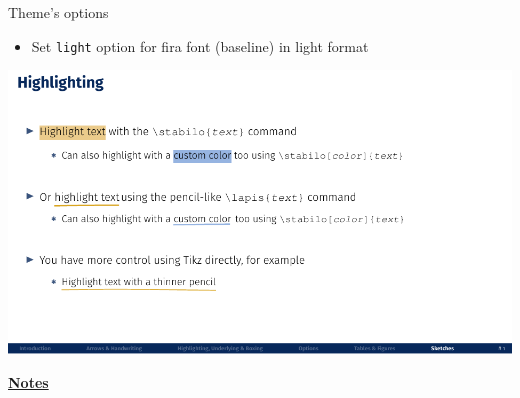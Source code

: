 \documentclass[10pt]{beamer}
\begin{document}
\begin{frame}
    {Theme's options}
    \begin{itemize}
        \item Set \texttt{light} option for fira font (baseline) in light format 
    \end{itemize}
    \begin{center}
        \begin{minipage}[b]{.6\textwidth}
            \includegraphics[width=\textwidth]{light}
        \end{minipage}
    \end{center}
\end{frame}
\begin{flushleft}
    \underline{\textbf{Notes}}\setlength{\parskip}{.15cm}\notesize\newline\par
\end{flushleft}
\end{document}
